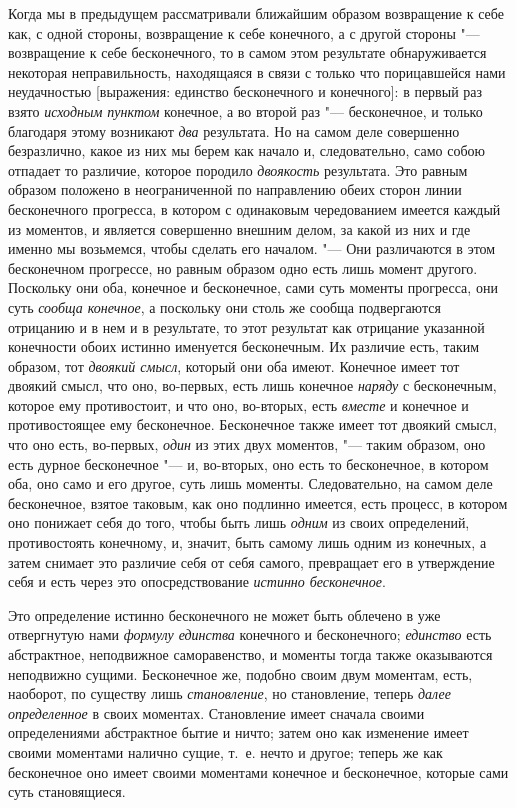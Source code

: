 Когда мы в предыдущем рассматривали ближайшим образом возвращение к себе
как, с одной стороны, возвращение к себе конечного, а с другой стороны
"--- возвращение к себе бесконечного, то в самом этом результате
обнаруживается некоторая неправильность, находящаяся в связи с только что
порицавшейся нами неудачностью [выражения: единство бесконечного и
конечного]: в первый раз взято {\em исходным пунктом}
конечное, а во второй раз "--- бесконечное, и только благодаря этому возникают
{\em два} результата. Но на самом деле совершенно
безразлично, какое из них мы берем как начало и, следовательно, само собою
отпадает то различие, которое породило {\em двоякость}
результата. Это равным образом положено в неограниченной по направлению
обеих сторон линии бесконечного прогресса, в котором с одинаковым
чередованием имеется каждый из моментов, и является совершенно внешним
делом, за какой из них и где именно мы возьмемся, чтобы сделать его
началом. "--- Они различаются в этом бесконечном прогрессе, но равным образом
одно есть лишь момент другого. Поскольку они оба, конечное и бесконечное,
сами суть моменты прогресса, они суть {\em сообща
конечное}, а поскольку они столь же сообща подвергаются отрицанию и в нем и
в результате, то этот результат как отрицание указанной конечности обоих
истинно именуется бесконечным. Их различие есть, таким образом, тот
{\em двоякий смысл}, который они оба имеют. Конечное
имеет тот двоякий смысл, что оно, во-первых, есть лишь конечное
{\em наряду} с бесконечным, которое ему противостоит, и
что оно, во-вторых, есть {\em вместе} и конечное и
противостоящее ему бесконечное. Бесконечное также имеет тот двоякий смысл,
что оно есть, во-первых, {\em один} из этих двух
моментов, "--- таким образом, оно есть дурное бесконечное "--- и, во-вторых, оно
есть то бесконечное, в котором оба, оно само и его другое, суть лишь
моменты. Следовательно, на самом деле бесконечное, взятое таковым, как оно
подлинно имеется, есть процесс, в котором оно понижает себя до того, чтобы
быть лишь {\em одним} из своих определений,
противостоять конечному, и, значит, быть самому лишь одним из конечных, а
затем снимает это различие себя от себя самого, превращает его в
утверждение себя и есть через это опосредствование
{\em истинно бесконечное}.

Это определение истинно бесконечного не может быть облечено в уже
отвергнутую нами {\em формулу единства} конечного и
бесконечного; {\em единство} есть абстрактное,
неподвижное саморавенство, и моменты тогда также оказываются неподвижно
сущими. Бесконечное же, подобно своим двум моментам, есть, наоборот, по
существу лишь {\em становление}, но становление, теперь
{\em далее определенное} в своих моментах. Становление
имеет сначала своими определениями абстрактное бытие и ничто; затем оно как
изменение имеет своими моментами налично сущие, т.~е. нечто и другое;
теперь же как бесконечное оно имеет своими моментами конечное и
бесконечное, которые сами суть становящиеся.

